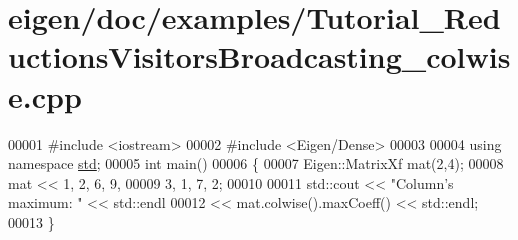 \hypertarget{eigen_2doc_2examples_2_tutorial___reductions_visitors_broadcasting__colwise_8cpp_source}{}\section{eigen/doc/examples/\+Tutorial\+\_\+\+Reductions\+Visitors\+Broadcasting\+\_\+colwise.cpp}
\label{eigen_2doc_2examples_2_tutorial___reductions_visitors_broadcasting__colwise_8cpp_source}

\begin{DoxyCode}
00001 \textcolor{preprocessor}{#include <iostream>}
00002 \textcolor{preprocessor}{#include <Eigen/Dense>}
00003 
00004 \textcolor{keyword}{using namespace }\hyperlink{namespacestd}{std};
00005 \textcolor{keywordtype}{int} main()
00006 \{
00007   Eigen::MatrixXf mat(2,4);
00008   mat << 1, 2, 6, 9,
00009          3, 1, 7, 2;
00010   
00011   std::cout << \textcolor{stringliteral}{"Column's maximum: "} << std::endl
00012    << mat.colwise().maxCoeff() << std::endl;
00013 \}
\end{DoxyCode}
